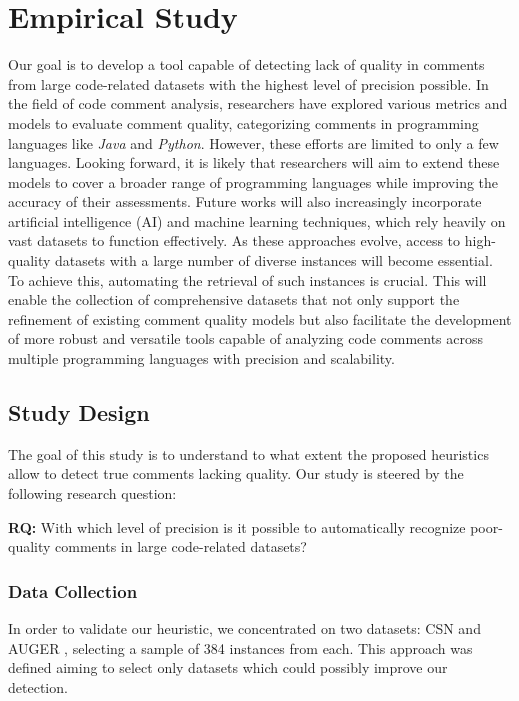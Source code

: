 
\chapter{Empirical Study} %

\label{Chapter4}


Our goal is to develop a tool capable of detecting lack of quality in comments from large code-related datasets with the highest level of precision possible. In the field of code comment analysis, researchers have explored various metrics and models to evaluate comment quality, categorizing comments in programming languages like \textit{Java} and \textit{Python}. However, these efforts are limited to only a few languages.
Looking forward, it is likely that researchers will aim to extend these models to cover a broader range of programming languages while improving the accuracy of their assessments. Future works will also increasingly incorporate artificial intelligence (AI) and machine learning techniques, which rely heavily on vast datasets to function effectively. As these approaches evolve, access to high-quality datasets with a large number of diverse instances will become essential.
To achieve this, automating the retrieval of such instances is crucial. This will enable the collection of comprehensive datasets that not only support the refinement of existing comment quality models but also facilitate the development of more robust and versatile tools capable of analyzing code comments across multiple programming languages with precision and scalability.

\section{Study Design}
The goal of this study is to understand to what extent the proposed heuristics allow to detect true comments lacking quality. Our study is steered by the following research
question:
\begin{large}
	\begin{Center}
		\textbf{RQ:} With which level of precision is it possible to automatically recognize poor-quality comments in large code-related datasets?
	\end{Center}
\end{large}

\subsection{Data Collection}
In order to validate our heuristic, we concentrated on two datasets: CSN \cite{CSN} and AUGER \cite{AUGER}, selecting a sample of 384 instances from each. This approach was defined aiming to select only datasets which could possibly improve our detection.

